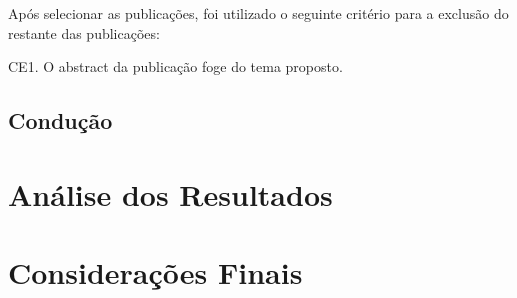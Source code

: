 \documentclass[12pt]{article}
\begin{document}
Após selecionar as publicações, foi utilizado o seguinte critério para a exclusão do restante das publicações:

CE1. O abstract da publicação foge do tema proposto.



\subsection{Condução}

\section{Análise dos Resultados}

\section{Considerações Finais}



\end{document}
